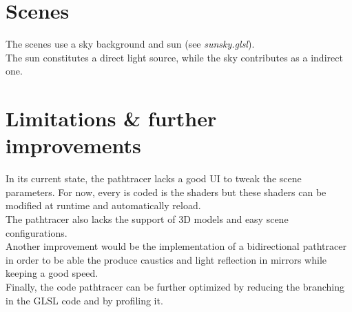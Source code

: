 \documentclass[a4paper,10pt]{article}
\begin{document}
\section{Scenes}

The scenes use a sky background and sun (see \textit{sunsky.glsl}). \\
The sun constitutes a direct light source, while the sky contributes as a indirect one.


\section{Limitations \& further improvements}

In its current state, the pathtracer lacks a good UI to tweak the scene parameters. For now, every is coded is the shaders but these shaders can be modified at runtime and automatically reload. \\
The pathtracer also lacks the support of 3D models and easy scene configurations.\\
Another improvement would be the implementation of a bidirectional pathtracer in order to be able the produce caustics and light reflection in mirrors while keeping a good speed. \\
Finally, the code pathtracer can be further optimized by reducing the branching in the GLSL code and by profiling it.
\end{document}
